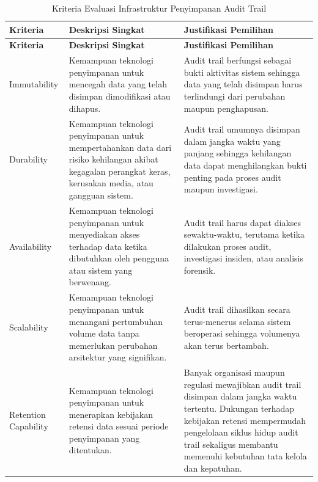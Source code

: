 \begin{xltabular}{\textwidth}{|>{\raggedright\arraybackslash}p{3cm}|>{\raggedright\arraybackslash}p{4cm}|X|}
    \caption{Kriteria Evaluasi Infrastruktur Penyimpanan Audit Trail}
    \label{tab:storage-criteria} \\
    \hline
    \textbf{Kriteria} &
    \textbf{Deskripsi Singkat} &
    \textbf{Justifikasi Pemilihan} \\
    \hline
    \endfirsthead

    \hline
    \textbf{Kriteria} &
    \textbf{Deskripsi Singkat} &
    \textbf{Justifikasi Pemilihan} \\
    \hline
    \endhead

    Immutability &
    Kemampuan teknologi penyimpanan untuk mencegah data yang telah disimpan dimodifikasi atau dihapus. &
    Audit trail berfungsi sebagai bukti aktivitas sistem sehingga data yang telah disimpan harus terlindungi dari perubahan maupun penghapusan. \\
    \hline

    Durability &
    Kemampuan teknologi penyimpanan untuk mempertahankan data dari risiko kehilangan akibat kegagalan perangkat keras, kerusakan media, atau gangguan sistem. &
    Audit trail umumnya disimpan dalam jangka waktu yang panjang sehingga kehilangan data dapat menghilangkan bukti penting pada proses audit maupun investigasi. \\
    \hline

    Availability &
    Kemampuan teknologi penyimpanan untuk menyediakan akses terhadap data ketika dibutuhkan oleh pengguna atau sistem yang berwenang. &
    Audit trail harus dapat diakses sewaktu-waktu, terutama ketika dilakukan proses audit, investigasi insiden, atau analisis forensik. \\
    \hline

    Scalability &
    Kemampuan teknologi penyimpanan untuk menangani pertumbuhan volume data tanpa memerlukan perubahan arsitektur yang signifikan. &
    Audit trail dihasilkan secara terus-menerus selama sistem beroperasi sehingga volumenya akan terus bertambah. \\
    \hline

    Retention Capability &
    Kemampuan teknologi penyimpanan untuk menerapkan kebijakan retensi data sesuai periode penyimpanan yang ditentukan. &
    Banyak organisasi maupun regulasi mewajibkan audit trail disimpan dalam jangka waktu tertentu. Dukungan terhadap kebijakan retensi mempermudah pengelolaan siklus hidup audit trail sekaligus membantu memenuhi kebutuhan tata kelola dan kepatuhan. \\
    \hline


\end{xltabular}
